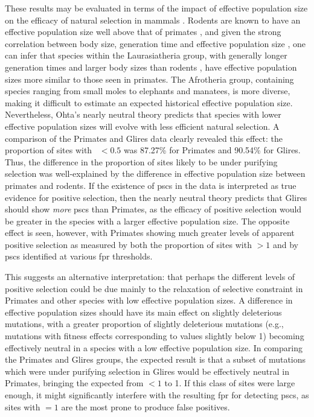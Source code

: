 These results may be evaluated in terms of the impact of effective
population size on the efficacy of natural selection in mammals
\citep{Popadin2007,Nikolaev2007,Ellegren2009}. Rodents are known to
have an effective population size well above that of primates
\citep{Kosiol2008}, and given the strong correlation between body
size, generation time and effective population size
\citep{Nikolaev2007}, one can infer that species within the
Laurasiatheria group, with generally longer generation times and
larger body sizes than rodents \citep{Hou2009}, have effective
population sizes more similar to those seen in primates. The
Afrotheria group, containing species ranging from small moles to
elephants and manatees, is more diverse, making it difficult to
estimate an expected historical effective population
size. Nevertheless, Ohta's nearly neutral theory \citep{Ohta1992}
predicts that species with lower effective population sizes will
evolve with less efficient natural selection. A comparison of the
Primates and Glires data clearly revealed this effect: the proportion
of sites with \omgml~$<0.5$ was 87.27\% for Primates and 90.54\% for
Glires. Thus, the difference in the proportion of sites likely to be
under purifying selection was well-explained by the difference in
effective population size between primates and rodents. If the
existence of \acp{psc} in the \sw data is interpreted as true evidence
for positive selection, then the nearly neutral theory predicts that
Glires should show \emph{more} \acp{psc} than Primates, as the
efficacy of positive selection would be greater in the species with a
larger effective population size. The opposite effect is seen,
however, with Primates showing much greater levels of apparent
positive selection as measured by both the proportion of sites with
\omgml$>1$ and by \acp{psc} identified at various \ac{fpr} thresholds.

This suggests an alternative interpretation: that perhaps the
different levels of positive selection could be due mainly to the
relaxation of selective constraint in Primates and other species with
low effective population sizes. A difference in effective population
sizes should have its main effect on slightly deleterious mutations,
with a greater proportion of slightly deleterious mutations (e.g.,
mutations with fitness effects corresponding to \dnds values slightly
below 1) becoming effectively neutral in a species with a low
effective population size. In comparing the Primates and Glires
groups, the expected result is that a subset of mutations which were
under purifying selection in Glires would be effectively neutral in
Primates, bringing the expected \omg from $<1$ to 1. If this class of
sites were large enough, it might significantly interfere with the
resulting \ac{fpr} for detecting \acp{psc}, as sites with \omg$=1$ are
the most prone to produce false positives.

